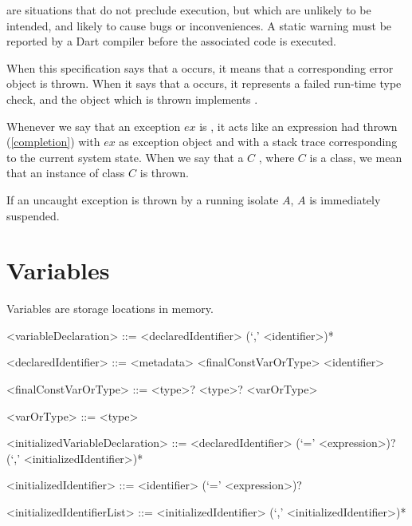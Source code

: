 \documentclass[makeidx]{article}
\begin{document}

\LMHash{}%
are situations that do not preclude execution,
but which are unlikely to be intended,
and likely to cause bugs or inconveniences.
A static warning must be reported by a Dart compiler before the associated code is executed.

\LMHash{}%
When this specification says that a  occurs,
it means that a corresponding error object is thrown.
When it says that a  occurs,
it represents a failed run-time type check,
and the object which is thrown implements .

\LMHash{}%
Whenever we say that an exception $ex$ is
,
it acts like an expression had thrown (\ref{completion})
with $ex$ as exception object and with a stack trace
corresponding to the current system state.
When we say that a $C$ ,
where $C$ is a class, we mean that an instance of class $C$ is thrown.

\LMHash{}%
If an uncaught exception is thrown by a running isolate $A$, $A$ is immediately suspended.


\section{Variables}

\LMHash{}%
Variables are storage locations in memory.

\begin{grammar}
<variableDeclaration> ::= <declaredIdentifier> (`,' <identifier>)*

<declaredIdentifier> ::= <metadata> <finalConstVarOrType> <identifier>

<finalConstVarOrType> ::= \FINAL{} <type>?
  \alt \CONST{} <type>?
  \alt <varOrType>

<varOrType> ::= \VAR{}
  \alt <type>

<initializedVariableDeclaration> ::= \gnewline{}
  <declaredIdentifier> (`=' <expression>)? (`,' <initializedIdentifier>)*

<initializedIdentifier> ::= <identifier> (`=' <expression>)?

<initializedIdentifierList> ::= <initializedIdentifier> (`,' <initializedIdentifier>)*
\end{grammar}
\end{document}
